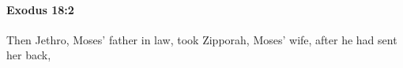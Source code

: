 
		\paragraph{Exodus 18:2} %
			\label{EXODUS-18-2}

			Then Jethro, Moses' father in law, took Zipporah, Moses' wife, after he had sent her back,


